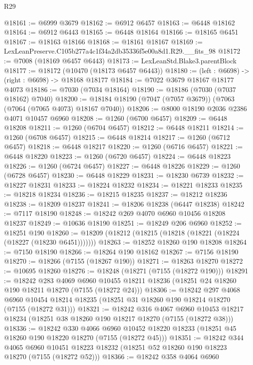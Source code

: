 \begin{lexlean}{R29}
\begin{coremodule}
@18161 := @6999 @3679
@18162 := @6912 @6457
@18163 := @6448 @18162
@18164 := @6912 @6443
@18165 := @6448 @18164
@18166 := @18165 @6451
@18167 := @18163 @18166
@18168 := @18161 @18167
@18169 := LexLeanPreserve.C105b277a4c1f34a2db35336f5e00a8d1.R29.__fits_98
@18172 := @7008 (@18169 @6457 @6443)
@18173 := LexLeanStd.Blake3.parentBlock
@18177 := @18172 (@10470 (@18173 @6457 @6443))
@18180 := (left : @6698) -> (right : @6698) -> @18168 @18177
@18184 := @7022 @3679 @18167 @18177 @4073
@18186 := @7030 (@7034 @18164)
@18190 := @18186 (@7030 (@7037 @18162) @7040)
@18200 := @18184 @18190 (@7047 (@7057 @3679)) (@7063 (@7064 (@7065 @4073) @18167 @7040))
@18206 := @8000 @18190 @2036 @2386 @4071 @10457 @6960
@18208 := @1260 (@6700 @6457)
@18209 := @6448 @18208
@18211 := @1260 (@6704 @6457)
@18212 := @6448 @18211
@18214 := @1260 (@6708 @6457)
@18215 := @6448 @18214
@18217 := @1260 (@6712 @6457)
@18218 := @6448 @18217
@18220 := @1260 (@6716 @6457)
@18221 := @6448 @18220
@18223 := @1260 (@6720 @6457)
@18224 := @6448 @18223
@18226 := @1260 (@6724 @6457)
@18227 := @6448 @18226
@18229 := @1260 (@6728 @6457)
@18230 := @6448 @18229
@18231 := @18230 @6739
@18232 := @18227 @18231
@18233 := @18224 @18232
@18234 := @18221 @18233
@18235 := @18218 @18234
@18236 := @18215 @18235
@18237 := @18212 @18236
@18238 := @18209 @18237
@18241 := @18206 @18238 (@6447 @18238)
@18242 := @7117 @18190
@18248 := @18242 @269 @4070 @6960 @10456 @18208 @18237
@18249 := @10636 @18190
@18251 := @18249 @206 @6960
@18252 := @18251 @190
@18260 := @18209 (@18212 (@18215 (@18218 (@18221 (@18224 (@18227 (@18230 @6451)))))))
@18263 := @18252 @18260 @190 @18208
@18264 := @7150 @18190
@18266 := @18264 @190 @18162
@18267 := @7156 @18190
@18270 := @18266 (@7155 (@18267 @190))
@18271 := @18263 @18270
@18272 := @10695 @18260
@18276 := @18248 (@18271 (@7155 (@18272 @190)))
@18291 := @18242
    @283
    @4069
    @6960
    @10455
    @18211
    @18236
    (@18251 @24 @18260 @190 @18211 @18270 (@7155 (@18272 @24)))
@18306 := @18242
    @297
    @4068
    @6960
    @10454
    @18214
    @18235
    (@18251 @31 @18260 @190 @18214 @18270 (@7155 (@18272 @31)))
@18321 := @18242
    @316
    @4067
    @6960
    @10453
    @18217
    @18234
    (@18251 @38 @18260 @190 @18217 @18270 (@7155 (@18272 @38)))
@18336 := @18242
    @330
    @4066
    @6960
    @10452
    @18220
    @18233
    (@18251 @45 @18260 @190 @18220 @18270 (@7155 (@18272 @45)))
@18351 := @18242
    @344
    @4065
    @6960
    @10451
    @18223
    @18232
    (@18251 @52 @18260 @190 @18223 @18270 (@7155 (@18272 @52)))
@18366 := @18242
    @358
    @4064
    @6960

\end{coremodule}
\end{lexlean}
